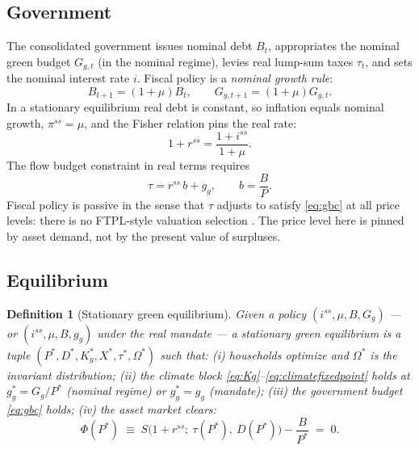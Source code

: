 \documentclass[12pt]{article}
\newtheorem{definition}{Definition}
\newcommand{\Sfun}{S}
\begin{document}
\subsection{Government}\label{subsec:government}

The consolidated government issues nominal debt $B_t$, appropriates the
nominal green budget $G_{g,t}$ (in the nominal regime), levies real lump-sum
taxes $\tau_t$, and sets the nominal interest rate $i$. Fiscal policy is a
\emph{nominal growth rule}:
\begin{equation}
B_{t+1} = (1+\mu)B_t, \qquad G_{g,t+1} = (1+\mu)G_{g,t}.
\label{eq:nominalrule}
\end{equation}
In a stationary equilibrium real debt is constant, so inflation equals nominal
growth, $\pi^{ss}=\mu$, and the Fisher relation pins the real rate:
\begin{equation}
1+r^{ss} = \frac{1+i^{ss}}{1+\mu}.
\label{eq:fisher}
\end{equation}
The flow budget constraint in real terms requires
\begin{equation}
\tau = r^{ss}\, b + g_g, \qquad b = \frac{B}{P}.
\label{eq:gbc}
\end{equation}
Fiscal policy is passive in the sense that $\tau$ adjusts to satisfy
\eqref{eq:gbc} at all price levels: there is no FTPL-style valuation
selection \citep{reis2022,bianchimelosi2017}. The price level here is
pinned by asset demand, not by the present value of surpluses.

\subsection{Equilibrium}\label{subsec:equilibrium}

\begin{definition}[Stationary green equilibrium]\label{def:equilibrium}
Given a policy $(i^{ss},\mu,B,G_g)$ --- or $(i^{ss},\mu,B,g_g)$ under the real
mandate --- a stationary green equilibrium is a tuple
$(P^{*},D^{*},K_g^{*},X^{*},\tau^{*},\Omega^{*})$ such that:
(i) households optimize and $\Omega^{*}$ is the invariant distribution;
(ii) the climate block \eqref{eq:Kg}--\eqref{eq:climatefixedpoint} holds at
$g_g^{*}=G_g/P^{*}$ (nominal regime) or $g_g^{*}=g_g$ (mandate);
(iii) the government budget \eqref{eq:gbc} holds;
(iv) the asset market clears:
\begin{equation}
\Phi(P^{*}) \;\equiv\;
\Sfun\big(1+r^{ss};\ \tau(P^{*}),\ D(P^{*})\big) - \frac{B}{P^{*}} \;=\; 0.
\label{eq:assetmarket}
\end{equation}
\end{definition}
\end{document}

